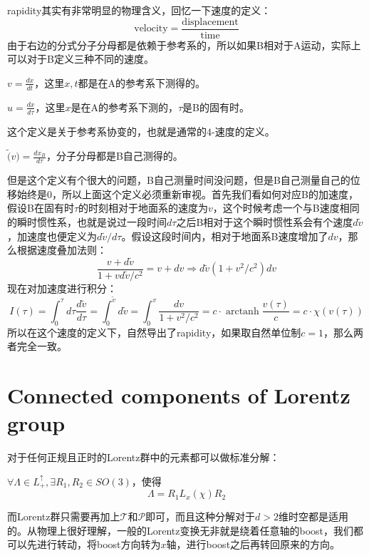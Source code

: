 rapidity其实有非常明显的物理含义，回忆一下速度的定义：
\[\text{velocity}=\frac{\text{displacement}}{\text{time}}\]
由于右边的分式分子分母都是依赖于参考系的，所以如果B相对于A运动，实际上可以对于B定义三种不同的速度。
\begin{definition}
	$v=\frac{dx}{dt}$，这里$x,t$都是在A的参考系下测得的。
\end{definition}
\begin{definition}
	$u=\frac{dx}{d\tau}$，这里$x$是在A的参考系下测的，$\tau$是B的固有时。
\end{definition}
这个定义是关于参考系协变的，也就是通常的$\mathfrak{4}$\mbox{-}速度的定义。
\begin{definition}
	$\tilde(v)=\frac{dx_B}{d\tau}$，分子分母都是B自己测得的。
\end{definition}
但是这个定义有个很大的问题，B自己测量时间没问题，但是B自己测量自己的位移始终是0，所以上面这个定义必须重新审视。首先我们看如何对应B的加速度，假设B在固有时$\tau$的时刻相对于地面系的速度为$v$，这个时候考虑一个与B速度相同的瞬时惯性系，也就是说过一段时间$d\tau$之后B相对于这个瞬时惯性系会有个速度$d\tilde{v}$，加速度也便定义为$d\tilde{v}/d\tau$。假设这段时间内，相对于地面系B速度增加了$dv$，那么根据速度叠加法则：
\begin{equation}
	\frac{v+d\tilde{v}}{1+vd\tilde{v}/c^2}=v+dv\Rightarrow d\tilde{v}\left(1+v^2/c^2\right)dv
\end{equation}
现在对加速度进行积分：
\begin{equation}
		I(\tau)=\int^\tau_0 d\tau\frac{d\tilde{v}}{d\tau}=\int^{\tilde{v}}_0d\tilde{v}=\int^{v}_0\frac{dv}{1+v^2/c^2}=c\cdot\operatorname{arctanh}\frac{v(\tau)}{c}=c\cdot\chi(v(\tau))
\end{equation}
所以在这个速度的定义下，自然导出了rapidity，如果取自然单位制$c=1$，那么两者完全一致。
\section{Connected components of Lorentz group}
对于任何正规且正时的Lorentz群中的元素都可以做标准分解：
\begin{theorem}
	$\forall \Lambda\in L_+^\uparrow, \exists R_1,R_2\in SO(3)$，使得
	\begin{equation}\label{eq:4.1}
		\Lambda = R_1 L_x(\chi) R_2
	\end{equation}
\end{theorem}
而Lorentz群只需要再加上$\mathcal{T}$和$\mathcal{P}$即可，而且这种分解对于$d>2$维时空都是适用的。从物理上很好理解，一般的Lorentz变换无非就是绕着任意轴的boost，我们都可以先进行转动，将boost方向转为$x$轴，进行boost之后再转回原来的方向。

